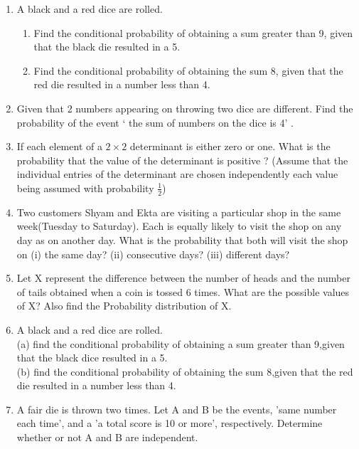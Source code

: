 \begin{enumerate}[label=\thechapter.\arabic*,ref=\thechapter.\theenumi]
\item A black and a red dice are rolled.
\begin{enumerate}
    \item Find the conditional probability of obtaining a sum greater than 9, given
that the black die resulted in a 5.
    \item Find the conditional probability of obtaining the sum 8, given that the red die
resulted in a number less than 4.
\end{enumerate}
		\solution
		
	\item Given that 2 numbers appearing on throwing two dice are different. Find the probability of the event ‘ the sum of numbers on the dice is 4’ .
		\\
		\solution
		
 \item If each element of a $2\times 2$ determinant is either zero or one. What is the probability that the value of the determinant is positive ? 
 (Assume that the individual entries of the determinant are chosen independently each value being assumed with probability $\frac{1}{2}$) \\
 \solution
		
\item Two customers Shyam and Ekta are visiting a particular shop in the same week(Tuesday to Saturday). Each is equally likely to visit the shop on any day as on another day. What is the probability that both will visit the shop on (i) the same day? (ii) consecutive days? (iii) different days?
\\
	
\item Let X represent the difference between the number of heads and the number of tails obtained when a coin is tossed 6 times. What are the possible values of X? Also find the Probability distribution of X.
\\
       
       \item A black and a red dice are rolled.\\
(a) find the conditional probability of obtaining a sum greater than 9,given that the black dice resulted in a 5.\\
(b) find the conditional probability of obtaining the sum 8,given that the red die resulted in a number less than 4.\\
\solution

\item A fair die is thrown two times. Let A and B be the events, 'same number each time', and a 'a total score is 10 or more', respectively. Determine whether or not A and B are independent.\\

\end{enumerate}
